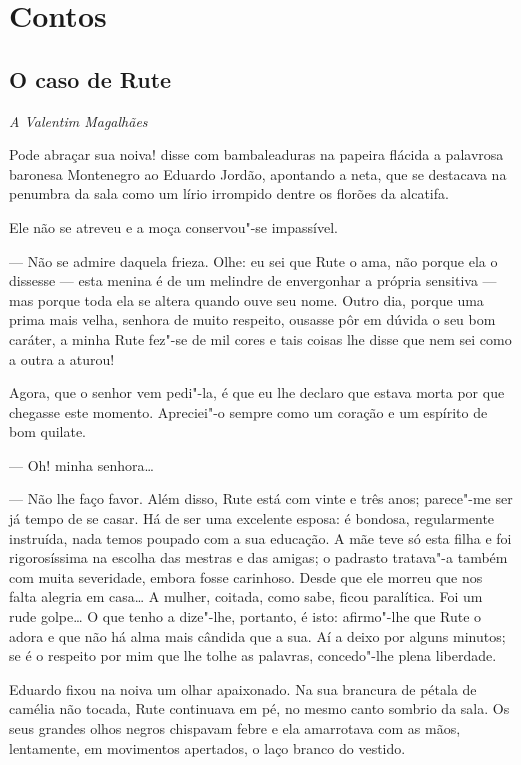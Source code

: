 
\part{Contos}

\chapter{O caso de Rute}

\hfill\emph{A Valentim Magalhães}

\bigskip

Pode abraçar sua noiva! disse com bambaleaduras na papeira flácida a
palavrosa baronesa Montenegro ao Eduardo Jordão, apontando a neta, que
se destacava na penumbra da sala como um lírio irrompido dentre os
florões da alcatifa.

Ele não se atreveu e a moça conservou"-se impassível.

--- Não se admire daquela frieza. Olhe: eu sei que Rute o ama, não porque
ela o dissesse --- esta menina é de um melindre de envergonhar a própria
sensitiva --- mas porque toda ela se altera quando ouve seu nome. Outro
dia, porque uma prima mais velha, senhora de muito respeito, ousasse pôr
em dúvida o seu bom caráter, a minha Rute fez"-se de mil cores e tais
coisas lhe disse que nem sei como a outra a aturou!

Agora, que o senhor vem pedi"-la, é que eu lhe declaro que estava morta
por que chegasse este momento. Apreciei"-o sempre como um coração e um
espírito de bom quilate.

--- Oh! minha senhora\ldots{}

--- Não lhe faço favor. Além disso, Rute está com vinte e três anos;
parece"-me ser já tempo de se casar. Há de ser uma excelente esposa: é
bondosa, regularmente instruída, nada temos poupado com a sua educação.
A mãe teve só esta filha e foi rigorosíssima na escolha das mestras e
das amigas; o padrasto tratava"-a também com muita severidade, embora
fosse carinhoso. Desde que ele morreu que nos falta alegria em casa\ldots{} A
mulher, coitada, como sabe, ficou paralítica. Foi um rude golpe\ldots{} O que
tenho a dize"-lhe, portanto, é isto: afirmo"-lhe que Rute o adora e que
não há alma mais cândida que a sua. Aí a deixo por alguns minutos; se é
o respeito por mim que lhe tolhe as palavras, concedo"-lhe plena
liberdade.

Eduardo fixou na noiva um olhar apaixonado. Na sua brancura de pétala de
camélia não tocada, Rute continuava em pé, no mesmo canto sombrio da
sala. Os seus grandes olhos negros chispavam febre e ela amarrotava com
as mãos, lentamente, em movimentos apertados, o laço branco do vestido.

